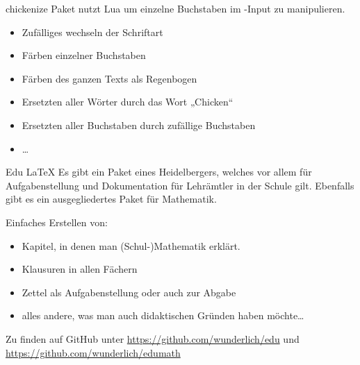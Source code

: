 \documentclass[
	vorläufig=false,
	datum=2021-12-22,
	titel={Witziges, Obskures und Sinnvolles…},
	web=false,
 	aspectratio=1610,
 	max,
]{../tex/latexkurs-slides}
\begin{document}
\begin{frame}[t]{chickenize}
\vfill
	Paket  nutzt Lua um einzelne Buchstaben im -Input zu manipulieren.
	
	\begin{itemize}
		\item Zufälliges wechseln der Schriftart
		\item Färben einzelner Buchstaben
		\item Färben des ganzen Texts als Regenbogen
		\item Ersetzten aller Wörter durch das Wort „Chicken“
		\item Ersetzten aller Buchstaben durch zufällige Buchstaben
		\item …
	\end{itemize}
\end{frame}

\begin{frame}{Edu \LaTeX}
    Es gibt ein Paket eines Heidelbergers, welches vor allem für Aufgabenstellung und Dokumentation für Lehrämtler in der Schule gilt. Ebenfalls gibt es ein ausgegliedertes Paket für Mathematik.

\vspace{1em}
    Einfaches Erstellen von:
    \begin{itemize}
        \item Kapitel, in denen man (Schul-)Mathematik erklärt.
        \item Klausuren in allen Fächern
        \item Zettel als Aufgabenstellung oder auch zur Abgabe
        \item alles andere, was man auch didaktischen Gründen haben möchte…
    \end{itemize}
\vspace{1em}
    Zu finden auf GitHub unter \url{https://github.com/wunderlich/edu} und \url{https://github.com/wunderlich/edumath}
\end{frame}
\end{document}
